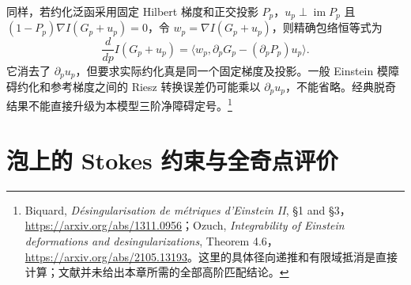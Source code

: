 \documentclass[UTF8,fontset=fandol,zihao=-4,oneside,openany]{ctexbook}
\theoremstyle{cjkplain}
\numberwithin{equation}{chapter}
\begin{document}
同样，若约化泛函采用固定 Hilbert 梯度和正交投影 $P_p$，$u_p\perp\operatorname{im}P_p$ 且
$(1-P_p)\nabla I(G_p+u_p)=0$，令 $w_p=\nabla I(G_p+u_p)$，则精确包络恒等式为
\begin{equation}\label{GAU:envelope}
\frac d{dp}I(G_p+u_p)
=\langle w_p,\partial_pG_p-(\partial_pP_p)u_p\rangle.
\end{equation}
它消去了 $\partial_pu_p$，但要求实际约化真是同一个固定梯度及投影。一般 Einstein 模障碍约化和参考梯度之间的 Riesz 转换误差仍可能乘以 $\partial_pu_p$，不能省略。经典脱奇结果不能直接升级为本模型三阶净障碍定号。\footnote{Biquard, \emph{Désingularisation de métriques d'Einstein II}, §1 and §3，\url{https://arxiv.org/abs/1311.0956}；Ozuch, \emph{Integrability of Einstein deformations and desingularizations}, Theorem 4.6，\url{https://arxiv.org/abs/2105.13193}。这里的具体径向递推和有限域抵消是直接计算；文献并未给出本章所需的全部高阶匹配结论。}

\section{泡上的 Stokes 约束与全奇点评价}
\label{GAU:period}
\end{document}
